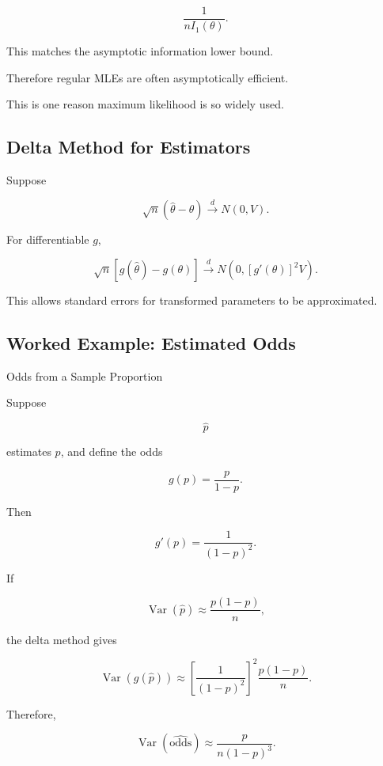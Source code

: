 \[
\boxed{
\frac1{
nI_1(\theta)
}.
}
\]

This matches the asymptotic information lower bound.

Therefore regular MLEs are often asymptotically efficient.

This is one reason maximum likelihood is so widely used.

\subsection{Delta Method for Estimators}
\label{subsec:delta-method-estimation}

Suppose

\[
\sqrt{n}
(
\widehat{\theta}-\theta
)
\xrightarrow{d}
N(0,V).
\]

For differentiable \(g\),

\[
\boxed{
\sqrt{n}
[
g(\widehat{\theta})-g(\theta)
]
\xrightarrow{d}
N
\left(
0,
[g'(\theta)]^2V
\right).
}
\]

This allows standard errors for transformed parameters to be
approximated.

\subsection{Worked Example: Estimated Odds}
\label{subsec:worked-delta-odds}

\begin{workedexamplebox}{Odds from a Sample Proportion}

Suppose

\[
\widehat{p}
\]

estimates \(p\), and define the odds

\[
g(p)
=
\frac{p}{1-p}.
\]

Then

\[
g'(p)
=
\frac1{(1-p)^2}.
\]

If

\[
\operatorname{Var}(\widehat{p})
\approx
\frac{
p(1-p)
}{n},
\]

the delta method gives

\[
\operatorname{Var}
(
g(\widehat{p})
)
\approx
\left[
\frac1{(1-p)^2}
\right]^2
\frac{
p(1-p)
}{n}.
\]

Therefore,

\begin{answerbox}
\[
\boxed{
\operatorname{Var}
(
\widehat{\text{odds}}
)
\approx
\frac{
p
}{
n(1-p)^3
}.
}
\]
\end{answerbox}

\end{workedexamplebox}

